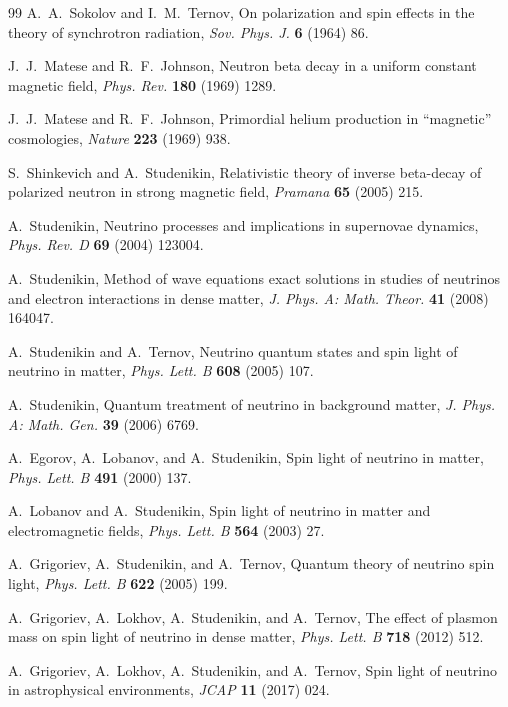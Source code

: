 \documentclass[a4paper,11pt]{article}
\begin{document}
\begin{thebibliography}{99}
A.~A.~Sokolov and I.~M.~Ternov,
On polarization and spin effects in the theory of synchrotron radiation,
{\em Sov. Phys. J.} {\bf 6} (1964) 86.

J.~J.~Matese and R.~F.~Johnson,
Neutron beta decay in a uniform constant magnetic field,
{\em Phys. Rev.} {\bf 180} (1969) 1289.

J.~J.~Matese and R.~F.~Johnson,
Primordial helium production in ``magnetic'' cosmologies,
{\em Nature} {\bf 223} (1969) 938.

S.~Shinkevich and A.~Studenikin,
Relativistic theory of inverse beta-decay of polarized neutron in strong magnetic field,
{\em Pramana} {\bf 65} (2005) 215.

A.~Studenikin,
Neutrino processes and implications in supernovae dynamics,
{\em Phys. Rev. D} {\bf 69} (2004) 123004.

A.~Studenikin,
Method of wave equations exact solutions in studies of neutrinos and electron interactions in dense matter,
{\em J. Phys. A: Math. Theor.} {\bf 41} (2008) 164047.

A.~Studenikin and A.~Ternov,
Neutrino quantum states and spin light of neutrino in matter,
{\em Phys. Lett. B} {\bf 608} (2005) 107.

A.~Studenikin,
Quantum treatment of neutrino in background matter,
{\em J. Phys. A: Math. Gen.} {\bf 39} (2006) 6769.

A.~Egorov, A.~Lobanov, and A.~Studenikin,
Spin light of neutrino in matter,
{\em Phys. Lett. B} {\bf 491} (2000) 137.

A.~Lobanov and A.~Studenikin,
Spin light of neutrino in matter and electromagnetic fields,
{\em Phys. Lett. B} {\bf 564} (2003) 27.

A.~Grigoriev, A.~Studenikin, and A.~Ternov,
Quantum theory of neutrino spin light,
{\em Phys. Lett. B} {\bf 622} (2005) 199.

A.~Grigoriev, A.~Lokhov, A.~Studenikin, and A.~Ternov,
The effect of plasmon mass on spin light of neutrino in dense matter,
{\em Phys. Lett. B} {\bf 718} (2012) 512.

A.~Grigoriev, A.~Lokhov, A.~Studenikin, and A.~Ternov,
Spin light of neutrino in astrophysical environments,
{\em JCAP} {\bf 11} (2017) 024.


\end{thebibliography}
\end{document}
